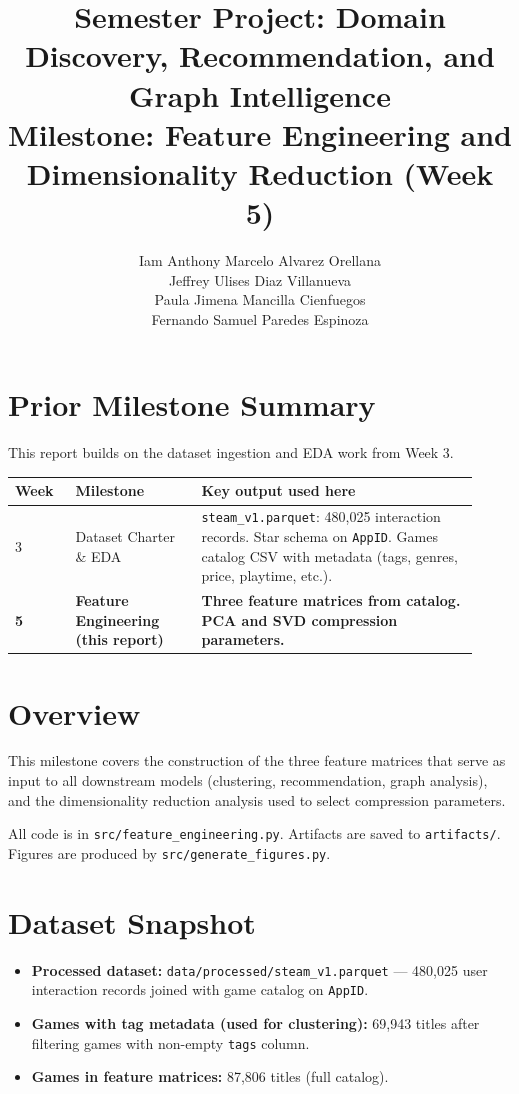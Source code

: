 \documentclass[11pt,a4paper]{article}
\title{Semester Project: Domain Discovery, Recommendation, and Graph Intelligence\\
\large Milestone: Feature Engineering and Dimensionality Reduction (Week 5)}
\author{Iam Anthony Marcelo Alvarez Orellana \\ Jeffrey Ulises Diaz Villanueva \\ Paula Jimena Mancilla Cienfuegos \\ Fernando Samuel Paredes Espinoza}
\date{}
\begin{document}
\maketitle
\onehalfspacing

\section{Prior Milestone Summary}

This report builds on the dataset ingestion and EDA work from Week 3.

\begin{longtable}{p{0.12\linewidth}p{0.25\linewidth}p{0.55\linewidth}}
\toprule
\textbf{Week} & \textbf{Milestone} & \textbf{Key output used here} \\
\midrule
3 & Dataset Charter \& EDA & \texttt{steam\_v1.parquet}: 480,025 interaction records. Star schema on \texttt{AppID}. Games catalog CSV with metadata (tags, genres, price, playtime, etc.). \\
\midrule
\textbf{5} & \textbf{Feature Engineering (this report)} & \textbf{Three feature matrices from catalog. PCA and SVD compression parameters.} \\
\bottomrule
\end{longtable}

\section{Overview}

This milestone covers the construction of the three feature matrices that serve as input to all downstream models (clustering, recommendation, graph analysis), and the dimensionality reduction analysis used to select compression parameters.

All code is in \texttt{src/feature\_engineering.py}. Artifacts are saved to \texttt{artifacts/}. Figures are produced by \texttt{src/generate\_figures.py}.

\section{Dataset Snapshot}

\begin{itemize}[leftmargin=*]
  \item \textbf{Processed dataset:} \texttt{data/processed/steam\_v1.parquet} --- 480,025 user interaction records joined with game catalog on \texttt{AppID}.
  \item \textbf{Games with tag metadata (used for clustering):} 69,943 titles after filtering games with non-empty \texttt{tags} column.
  \item \textbf{Games in feature matrices:} 87,806 titles (full catalog).
\end{itemize}
\end{document}
